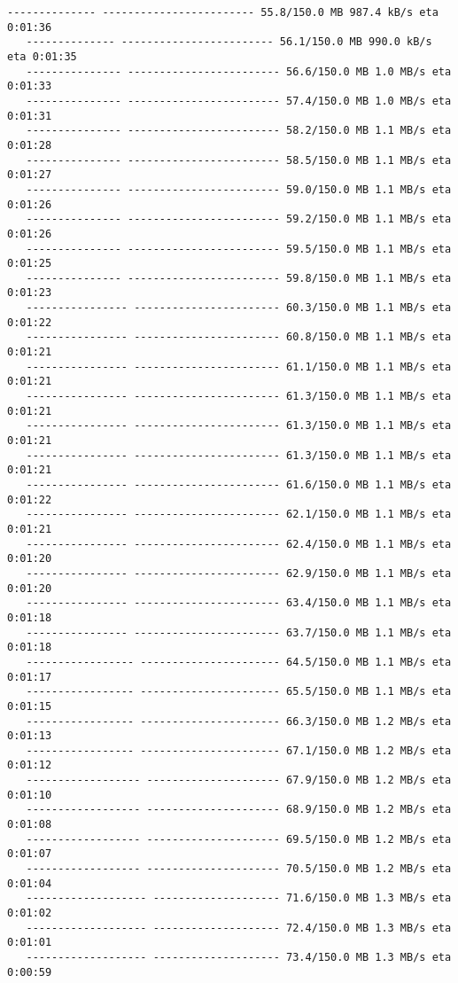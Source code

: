 \documentclass[11pt]{article}
\begin{document}
\begin{Verbatim}[commandchars=\\\{\}]
   -------------- ------------------------ 55.8/150.0 MB 987.4 kB/s eta 0:01:36
   -------------- ------------------------ 56.1/150.0 MB 990.0 kB/s eta 0:01:35
   --------------- ------------------------ 56.6/150.0 MB 1.0 MB/s eta 0:01:33
   --------------- ------------------------ 57.4/150.0 MB 1.0 MB/s eta 0:01:31
   --------------- ------------------------ 58.2/150.0 MB 1.1 MB/s eta 0:01:28
   --------------- ------------------------ 58.5/150.0 MB 1.1 MB/s eta 0:01:27
   --------------- ------------------------ 59.0/150.0 MB 1.1 MB/s eta 0:01:26
   --------------- ------------------------ 59.2/150.0 MB 1.1 MB/s eta 0:01:26
   --------------- ------------------------ 59.5/150.0 MB 1.1 MB/s eta 0:01:25
   --------------- ------------------------ 59.8/150.0 MB 1.1 MB/s eta 0:01:23
   ---------------- ----------------------- 60.3/150.0 MB 1.1 MB/s eta 0:01:22
   ---------------- ----------------------- 60.8/150.0 MB 1.1 MB/s eta 0:01:21
   ---------------- ----------------------- 61.1/150.0 MB 1.1 MB/s eta 0:01:21
   ---------------- ----------------------- 61.3/150.0 MB 1.1 MB/s eta 0:01:21
   ---------------- ----------------------- 61.3/150.0 MB 1.1 MB/s eta 0:01:21
   ---------------- ----------------------- 61.3/150.0 MB 1.1 MB/s eta 0:01:21
   ---------------- ----------------------- 61.6/150.0 MB 1.1 MB/s eta 0:01:22
   ---------------- ----------------------- 62.1/150.0 MB 1.1 MB/s eta 0:01:21
   ---------------- ----------------------- 62.4/150.0 MB 1.1 MB/s eta 0:01:20
   ---------------- ----------------------- 62.9/150.0 MB 1.1 MB/s eta 0:01:20
   ---------------- ----------------------- 63.4/150.0 MB 1.1 MB/s eta 0:01:18
   ---------------- ----------------------- 63.7/150.0 MB 1.1 MB/s eta 0:01:18
   ----------------- ---------------------- 64.5/150.0 MB 1.1 MB/s eta 0:01:17
   ----------------- ---------------------- 65.5/150.0 MB 1.1 MB/s eta 0:01:15
   ----------------- ---------------------- 66.3/150.0 MB 1.2 MB/s eta 0:01:13
   ----------------- ---------------------- 67.1/150.0 MB 1.2 MB/s eta 0:01:12
   ------------------ --------------------- 67.9/150.0 MB 1.2 MB/s eta 0:01:10
   ------------------ --------------------- 68.9/150.0 MB 1.2 MB/s eta 0:01:08
   ------------------ --------------------- 69.5/150.0 MB 1.2 MB/s eta 0:01:07
   ------------------ --------------------- 70.5/150.0 MB 1.2 MB/s eta 0:01:04
   ------------------- -------------------- 71.6/150.0 MB 1.3 MB/s eta 0:01:02
   ------------------- -------------------- 72.4/150.0 MB 1.3 MB/s eta 0:01:01
   ------------------- -------------------- 73.4/150.0 MB 1.3 MB/s eta 0:00:59

\end{Verbatim}
\end{document}
